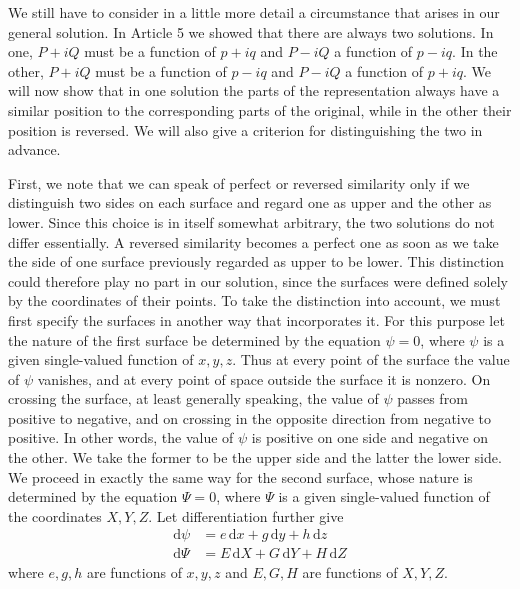 We still have to consider in a little more detail a circumstance that arises in our general solution. In Article 5 we showed that there are always two solutions. In one, \(P+iQ\) must be a function of \(p+iq\) and \(P-iQ\) a function of \(p-iq\). In the other, \(P+iQ\) must be a function of \(p-iq\) and \(P-iQ\) a function of \(p+iq\). We will now show that in one solution the parts of the representation always have a similar position to the corresponding parts of the original, while in the other their position is reversed. We will also give a criterion for distinguishing the two in advance.

First, we note that we can speak of perfect or reversed similarity only if we distinguish two sides on each surface and regard one as upper and the other as lower. Since this choice is in itself somewhat arbitrary, the two solutions do not differ essentially. A reversed similarity becomes a perfect one as soon as we take the side of one surface previously regarded as upper to be lower. This distinction could therefore play no part in our solution, since the surfaces were defined solely by the coordinates of their points. To take the distinction into account, we must first specify the surfaces in another way that incorporates it. For this purpose let the nature of the first surface be determined by the equation \(\psi=0\), where \(\psi\) is a given single-valued function of \(x,y,z\). Thus at every point of the surface the
value of \(\psi\) vanishes, and at every point of space outside the surface it is nonzero. On crossing the surface, at least generally speaking, the value of \(\psi\) passes from positive to negative, and on crossing in the opposite direction from negative to positive. In other words, the value of \(\psi\) is positive on one side and negative on the other. We take the former to be the upper side and the latter the lower side. We proceed in exactly the same way for the second surface, whose nature is determined by the equation \(\Psi=0\), where \(\Psi\) is a given single-valued function of the coordinates \(X,Y,Z\). Let differentiation further give
\[
\begin{aligned}
\mathrm{d}\psi&=e\,\mathrm{d}x+g\,\mathrm{d}y+h\,\mathrm{d}z\\
\mathrm{d}\Psi&=E\,\mathrm{d}X+G\,\mathrm{d}Y+H\,\mathrm{d}Z
\end{aligned}
\]
\noindent where \(e,g,h\) are functions of \(x,y,z\) and \(E,G,H\) are functions of \(X,Y,Z\).

